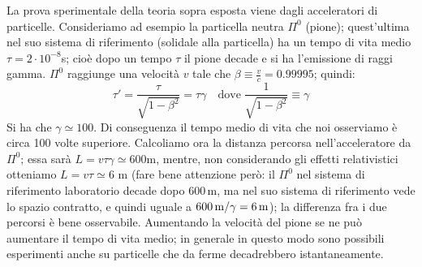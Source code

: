 \begin{esempio}[Decadimento $\Pi^{0}$]
  La prova sperimentale della teoria sopra esposta viene dagli
  acceleratori di particelle. Consideriamo ad esempio la particella
  neutra $\Pi^{{0}}$ (pione); quest'ultima nel suo sistema di
  riferimento (solidale alla particella) ha un tempo di vita medio
  $\tau=2\cdot 10^{-8}$s; cio\`e dopo un tempo $\tau$ il pione decade
  e si ha l'emissione di raggi gamma. $\Pi^{0}$ raggiunge una
  velocit\`a $v$ tale che $\beta \equiv \frac{v}{c}=0.99995$; quindi:
  \begin{displaymath}
    \tau'=\frac{\tau}{\sqrt{1-\beta^{2}}}=\tau \gamma \quad
    \textrm{dove}\;\frac{1}{\sqrt{1-\beta^{2}}}\equiv\gamma
  \end{displaymath}
  Si ha che $\gamma\simeq100$. Di conseguenza il tempo medio di vita
  che noi osserviamo \`e circa 100 volte superiore. Calcoliamo ora la
  distanza percorsa nell'acceleratore da
  $\Pi^{0}$; essa sar\`a $L=v\tau\gamma\simeq600$m, mentre, non
  considerando gli effetti relativistici otteniamo $L=v\tau \simeq6$ m
  (fare bene attenzione per\`o: il $\Pi^{0}$ nel sistema di
  riferimento laboratorio decade dopo $600\,$m, ma nel suo sistema di
  riferimento vede lo spazio contratto, e quindi uguale a $ 600 \,
  \mathrm{ m } / \gamma = 6 \, \mathrm{ m }$); la differenza fra i due
  percorsi \`e bene osservabile. Aumentando la velocit\`a del pione se
  ne pu\`o aumentare il tempo di vita medio; in generale in questo
  modo sono possibili esperimenti anche su particelle che da ferme
  decadrebbero istantaneamente.
\end{esempio}
